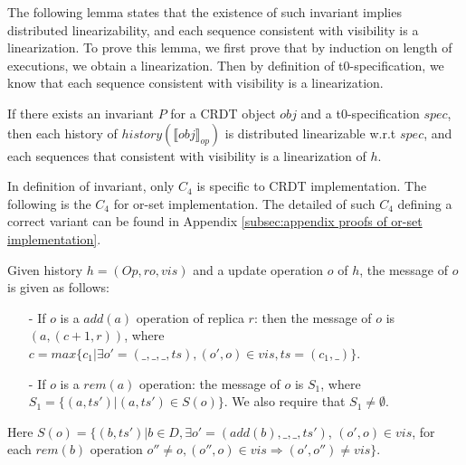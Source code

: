The following lemma states that the existence of such invariant implies distributed linearizability, and each sequence consistent with visibility is a linearization. To prove this lemma, we first prove that by induction on length of executions, we obtain a linearization. Then by definition of t0-specification, we know that each sequence consistent with visibility is a linearization. 

\begin{lemma}
\label{lemma:invariant of operation-based CRDT implies distributed linearizability for t0-specification}
If there exists an invariant $P$ for a CRDT object $\mathit{obj}$ and a t0-specification $\mathit{spec}$, then each history of $\mathit{history}(\llbracket \mathit{obj} \rrbracket_{\mathit{op}})$ is distributed linearizable w.r.t $\mathit{spec}$, and each sequences that consistent with visibility is a linearization of $h$.
\end{lemma}

In definition of invariant, only $C_4$ is specific to CRDT implementation. The following is the $C_4$ for or-set implementation. The detailed of such $C_4$ defining a correct variant can be found in Appendix \ref{subsec:appendix proofs of or-set implementation}.

\begin{example}
\label{example:c4 for or-set implementation}

Given history $h = (\mathit{Op},\mathit{ro},\mathit{vis})$ and a update operation $o$ of $h$, the message of $o$ is given as follows:

\begin{itemize}
\setlength{\itemsep}{0.5pt}
\item[-] If $o$ is a $\mathit{add}(a)$ operation of replica $r$:  then the message of $o$ is $(a,(c+1,r))$, where $c = \mathit{max}\{ c_1 \vert \exists o' = (\_,\_,\_,\mathit{ts}), (o',o) \in \mathit{vis}, \mathit{ts} = (c_1,\_) \}$. 

\item[-] If $o$ is a $\mathit{rem}(a)$ operation: the message of $o$ is $S_1$, where $S_1 = \{ (a,\mathit{ts}') \vert (a,\mathit{ts}') \in S(o) \}$. We also require that $S_1 \neq \emptyset$.
\end{itemize}
Here $S(o) = \{ (b,\mathit{ts}') \vert b \in D, \exists o' = (\mathit{add}(b),\_,\_,\mathit{ts}')$, $(o',o) \in \mathit{vis}$, for each $\mathit{rem}(b)$ operation $o'' \neq o, (o'',o) \in \mathit{vis} \Rightarrow (o',o'') \neq \mathit{vis} \}$.
\end{example}






